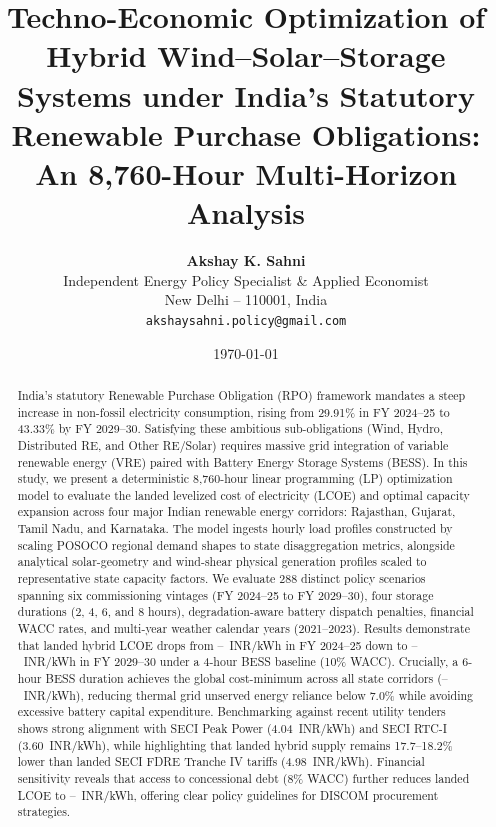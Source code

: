 \documentclass[11pt,a4paper]{article}
\title{\textbf{Techno-Economic Optimization of Hybrid Wind--Solar--Storage Systems under India's Statutory Renewable Purchase Obligations: An 8,760-Hour Multi-Horizon Analysis}}
\author{\textbf{Akshay K. Sahni}\\[0.5em]
\small Independent Energy Policy Specialist \& Applied Economist\\
\small New Delhi -- 110001, India\\
\small \texttt{akshaysahni.policy@gmail.com}}
\date{\today}
\begin{document}
\maketitle

\begin{abstract}
India's statutory Renewable Purchase Obligation (RPO) framework mandates a steep increase in non-fossil electricity consumption, rising from 29.91\% in FY 2024--25 to 43.33\% by FY 2029--30. Satisfying these ambitious sub-obligations (Wind, Hydro, Distributed RE, and Other RE/Solar) requires massive grid integration of variable renewable energy (VRE) paired with Battery Energy Storage Systems (BESS). In this study, we present a deterministic 8,760-hour linear programming (LP) optimization model to evaluate the landed levelized cost of electricity (LCOE) and optimal capacity expansion across four major Indian renewable energy corridors: Rajasthan, Gujarat, Tamil Nadu, and Karnataka. The model ingests hourly load profiles constructed by scaling POSOCO regional demand shapes to state disaggregation metrics, alongside analytical solar-geometry and wind-shear physical generation profiles scaled to representative state capacity factors. We evaluate 288 distinct policy scenarios spanning six commissioning vintages (FY 2024--25 to FY 2029--30), four storage durations (2, 4, 6, and 8 hours), degradation-aware battery dispatch penalties, financial WACC rates, and multi-year weather calendar years (2021--2023). Results demonstrate that landed hybrid LCOE drops from \ValLcoeTwentyFourMin--\ValLcoeTwentyFourMax~INR/kWh in FY 2024--25 down to \ValLcoeThirtyMin--\ValLcoeThirtyMax~INR/kWh in FY 2029--30 under a 4-hour BESS baseline (10\% WACC). Crucially, a 6-hour BESS duration achieves the global cost-minimum across all state corridors (\ValLcoeSixHourThirtyMin--\ValLcoeSixHourThirtyMax~INR/kWh), reducing thermal grid unserved energy reliance below 7.0\% while avoiding excessive battery capital expenditure. Benchmarking against recent utility tenders shows strong alignment with SECI Peak Power (4.04~INR/kWh) and SECI RTC-I (3.60~INR/kWh), while highlighting that landed hybrid supply remains 17.7--18.2\% lower than landed SECI FDRE Tranche IV tariffs (4.98~INR/kWh). Financial sensitivity reveals that access to concessional debt (8\% WACC) further reduces landed LCOE to \ValLcoeWaccEightMin--\ValLcoeWaccEightMax~INR/kWh, offering clear policy guidelines for DISCOM procurement strategies.
\end{abstract}
\end{document}
